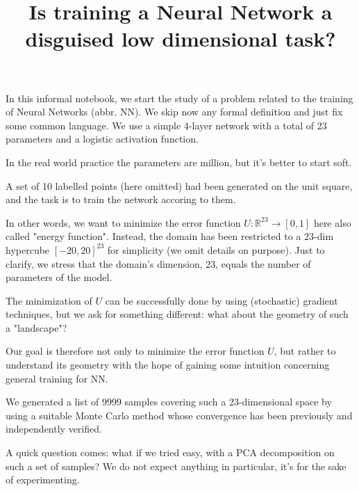 \documentclass[11pt]{article}
\title{Is training a Neural Network a disguised low dimensional task?}
\begin{document}
    
    
    \maketitle
    
    

    
    In this informal notebook, we start the study of a problem related to
the training of Neural Networks (abbr. NN). We skip now any formal
definition and just fix some common language. We use a simple 4-layer
network with a total of 23 parameters and a logistic activation
function.

In the real world practice the parameters are million, but it's better
to start soft.

A set of 10 labelled points (here omitted) had been generated on the
unit square, and the task is to train the network accoring to them.

In other words, we want to minimize the error function
\(U: \mathbb{R}^{23} \to [0,1]\) here also called "energy function".
Instead, the domain has been restricted to a \(23\)-dim hypercube
\([-20, 20]^{23}\) for simplicity (we omit details on purpose). Just to
clarify, we stress that the domain's dimension, \(23\), equals the
number of parameters of the model.

The minimization of \(U\) can be successfully done by using (stochastic)
gradient techniques, but we ask for something different: what about the
geometry of such a "landscape"?

    Our goal is therefore not only to minimize the error function \(U\), but
rather to understand its geometry with the hope of gaining some
intuition concerning general training for NN.

We generated a list of 9999 samples covering such a 23-dimensional space
by using a suitable Monte Carlo method whose convergence has been
previously and independently verified.

A quick question comes: what if we tried easy, with a PCA decomposition
on such a set of samples? We do not expect anything in particular, it's
for the sake of experimenting.
\end{document}
